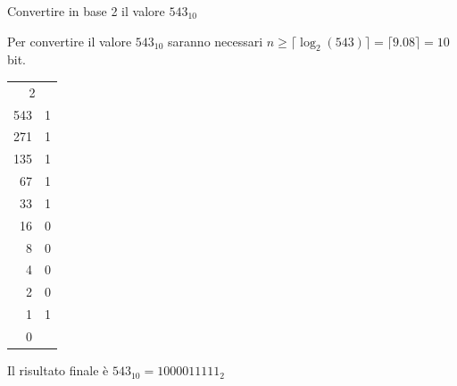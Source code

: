 \begin{Exercise}[label={ex:conv210}]
		Convertire in base 2 il valore $543_{10}$
\end{Exercise}

\begin{Answer}[ref={ex:conv210}]
    Per convertire il valore $543_{10}$ saranno necessari $n \geq \lceil \log_2(543) \rceil = \lceil 9.08 \rceil = 10$ bit. 
    \begin{center}
    \begin{tabular}{r|r}
        \multicolumn{2}{c}{2} \\
        543 & 1 \\
        271 & 1 \\
        135 & 1 \\
        67 & 1 \\
        33 & 1 \\
        16 & 0 \\
        8 & 0 \\
        4 & 0 \\
        2 & 0 \\
        1 & 1 \\
        0
    \end{tabular}
    \end{center}
    Il risultato finale è $543_{10} = 1000011111_2$
\end{Answer}